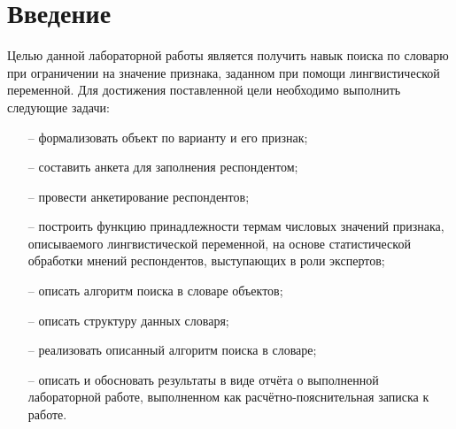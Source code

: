 \chapter*{Введение}


Целью данной лабораторной работы является получить навык поиска по словарю при ограничении на значение признака, заданном при помощи лингвистической переменной.
Для достижения поставленной цели необходимо выполнить следующие задачи:
\begin{itemize}
	\item[--] формализовать объект по варианту и его признак;
	\item[--] составить анкета для заполнения респондентом;
	\item[--] провести анкетирование респондентов;
	\item[--] построить функцию принадлежности термам числовых значений признака, описываемого лингвистической переменной, на основе статистической обработки мнений респондентов, выступающих в роли экспертов;
	\item[--] описать алгоритм поиска в словаре объектов;
	\item[--] описать структуру данных словаря;
	\item[--] реализовать описанный алгоритм поиска в словаре;
	\item[--] описать и обосновать результаты в виде отчёта о выполненной лабораторной работе, выполненном как расчётно-пояснительная записка к работе.
\end{itemize}